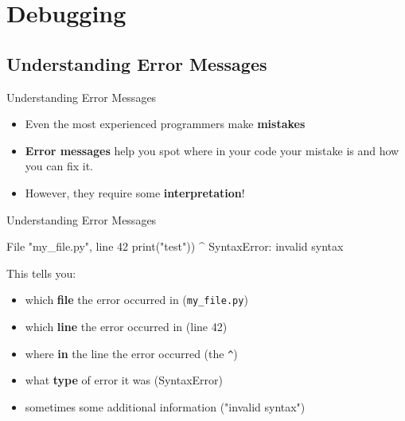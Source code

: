 \section{Debugging}

\subsection{Understanding Error Messages}

\begin{frame}{Understanding Error Messages}

    \begin{itemize}
        \item Even the most experienced programmers make \textbf{mistakes}
        \item \textbf{Error messages} help you spot where in your code your mistake is and how you can fix it.
        \item However, they require some \textbf{interpretation}!
    \end{itemize}


\end{frame}

\begin{frame}[fragile]{Understanding Error Messages}

    \begin{alertblock}{}
        \begin{outputcode}
      File "my_file.py", line 42
        print("test"))
                     ^
    SyntaxError: invalid syntax
        \end{outputcode}
    \end{alertblock}

    This tells you:

    \begin{itemize}
        \item which \textbf{file} the error occurred in (\texttt{my\_file.py})
        \item which \textbf{line} the error occurred in (line 42)
        \item where \textbf{in} the line the error occurred (the \texttt{\^})
        \item what \textbf{type} of error it was (SyntaxError)
        \item sometimes some additional information ("invalid syntax")
    \end{itemize}


\end{frame}

